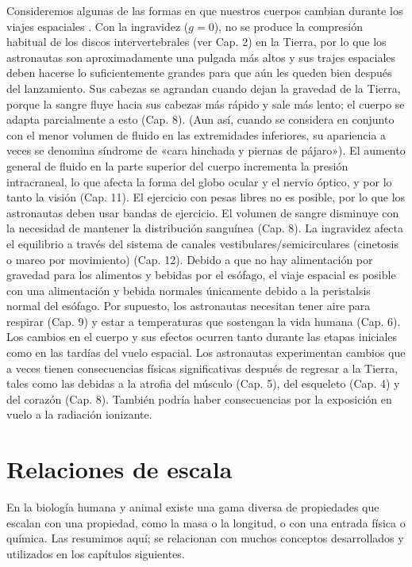 \documentclass[12pt]{book}
\begin{document}
Consideremos algunas de las formas en que nuestros cuerpos cambian durante los viajes espaciales \cite{21, 40}. Con la ingravidez ($g = 0$), no se produce la compresión habitual de los discos intervertebrales (ver Cap. 2) en la Tierra, por lo que los astronautas son aproximadamente una pulgada más altos y sus trajes espaciales deben hacerse lo suficientemente grandes para que aún les queden bien después del lanzamiento. Sus cabezas se agrandan cuando dejan la gravedad de la Tierra, porque la sangre fluye hacia sus cabezas más rápido y sale más lento; el cuerpo se adapta parcialmente a esto (Cap. 8). (Aun así, cuando se considera en conjunto con el menor volumen de fluido en las extremidades inferiores, su apariencia a veces se denomina síndrome de «cara hinchada y piernas de pájaro»). El aumento general de fluido en la parte superior del cuerpo incrementa la presión intracraneal, lo que afecta la forma del globo ocular y el nervio óptico, y por lo tanto la visión (Cap. 11). El ejercicio con pesas libres no es posible, por lo que los astronautas deben usar bandas de ejercicio. El volumen de sangre disminuye con la necesidad de mantener la distribución sanguínea (Cap. 8). La ingravidez afecta el equilibrio a través del sistema de canales vestibulares/semicirculares (cinetosis o mareo por movimiento) (Cap. 12). Debido a que no hay alimentación por gravedad para los alimentos y bebidas por el esófago, el viaje espacial es posible con una alimentación y bebida normales únicamente debido a la peristalsis normal del esófago. Por supuesto, los astronautas necesitan tener aire para respirar (Cap. 9) y estar a temperaturas que sostengan la vida humana (Cap. 6). Los cambios en el cuerpo y sus efectos ocurren tanto durante las etapas iniciales como en las tardías del vuelo espacial. Los astronautas experimentan cambios que a veces tienen consecuencias físicas significativas después de regresar a la Tierra, tales como las debidas a la atrofia del músculo (Cap. 5), del esqueleto (Cap. 4) y del corazón (Cap. 8). También podría haber consecuencias por la exposición en vuelo a la radiación ionizante.


\section{Relaciones de escala}

En la biología humana y animal existe una gama diversa de propiedades que escalan con una propiedad, como la masa o la longitud, o con una entrada física o química. Las resumimos aquí; se relacionan con muchos conceptos desarrollados y utilizados en los capítulos siguientes.
\end{document}
